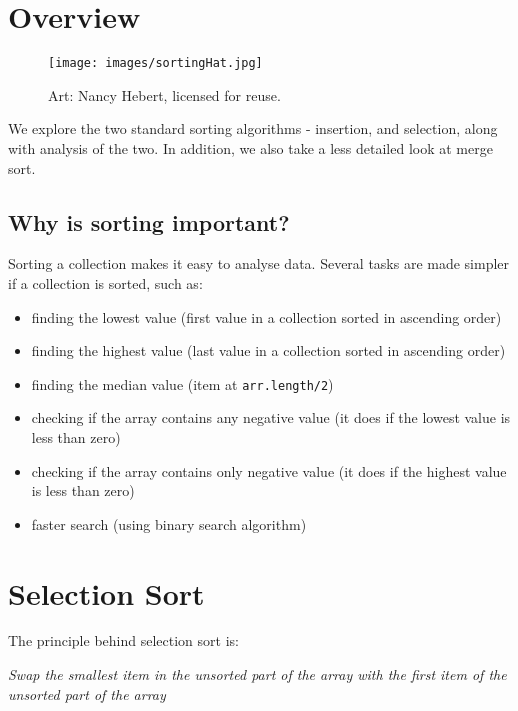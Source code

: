 \def\topic{Sorting}


\section{Overview}

\begin{figure}
\centering	
\texttt{[image: images/sortingHat.jpg]}
\caption{Art: Nancy Hebert, licensed for reuse.}
\end{figure}

  We explore the two standard sorting algorithms - insertion, and selection, along with analysis of the two. In addition, we also take a less detailed look at merge sort.
 
\subsection{Why is sorting important?}

Sorting a collection makes it easy to analyse data. Several tasks are made simpler if a collection is sorted, such as:

\begin{itemize}
\item finding the lowest value (first value in a collection sorted in ascending order)
\item finding the highest value (last value in a collection sorted in ascending order)
\item finding the median value (item at \texttt{arr.length/2})
\item checking if the array contains any negative value (it does if the lowest value is less than zero)	
\item checking if the array contains only negative value (it does if the highest value is less than zero)
\item faster search (using binary search algorithm)	
\end{itemize}



\section{Selection Sort}

The principle behind selection sort is:

\begin{center}
	\emph{
		Swap the smallest item in the unsorted part of the array with the first item of the unsorted part of the array}
\end{center}

